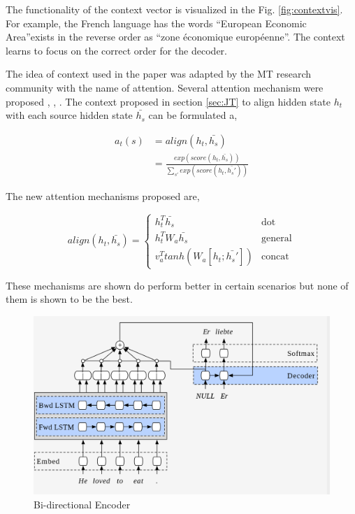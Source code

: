 \documentclass[a4paper]{article}
\begin{document}
The  functionality   of   the   context  vector  is   visualized  in   the  Fig.
\ref{fig:contextvis}.  For   example,  the   French  language   has  the   words
\textquotedblleft European Economic Area\textquotedblright exists in the reverse
order as \textquotedblleft zone \'{e}conomique europ\'{e}enne\textquotedblright.
The context learns to focus on the correct order for the decoder.


The  idea of context  used in the paper was adapted by the MT research community
with   the  name   of  attention.  Several  attention  mechanism  were  proposed
\cite{luong2015effective},  \cite{cho2014learning},  \cite{gregor2015draw}.  The
context proposed in  section \ref{sec:JT} to align hidden state  $h_t$ with each source
hidden state $\bar{h_s}$ can be formulated a,


\begin{equation}
  \begin{split}
    a_t(s) & = align(h_t,\bar{h_s}) \\
    & = \frac{exp(score(h_t,\bar{h_s}))}{\sum_{s'} exp(score(h_t,\bar{h_s'}))}
  \end{split}
\end{equation}


The new attention mechanisms proposed are,


\begin{equation*}
  align(h_t,\bar{h_s}) = \begin{cases}
    h_t^T\bar{h_s} & \text{dot} \\
    h_t^TW_a\bar{h_s} & \text{general} \\
    v_a^T tanh (W_a[h_t;\bar{h_s'}]) & \text{concat}
  \end{cases}
\end{equation*}


These mechanisms  are shown  do perform better  in certain scenarios but none of
them is shown to be the best.


\begin{figure}
  \includegraphics[width=0.9\linewidth]{img/birnn.png}
  \caption{Bi-directional Encoder}
  \label{fig:birnn}
\end{figure}
\end{document}
